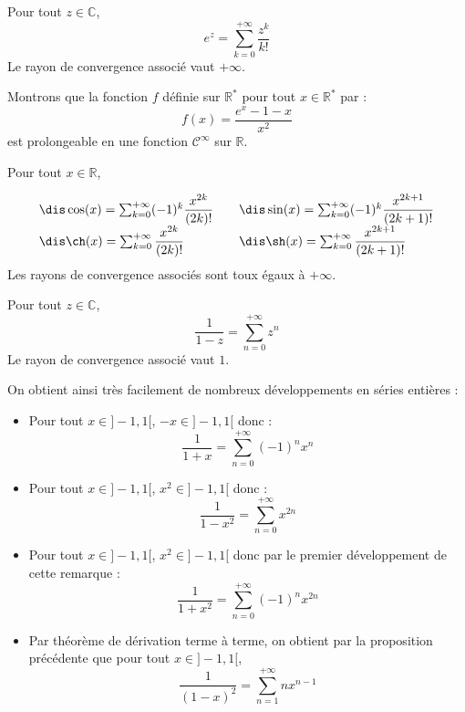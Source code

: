 \documentclass[a4paper,10pt]{report}
\begin{document}
\begin{thm} Pour tout $z \in \mathbb{C}$,
$$ e^z = \sum_{k=0}^{+ \infty} \dfrac{z^k}{k!}$$
Le rayon de convergence associé vaut $+ \infty$.
\end{thm}

\begin{preuve}
\vspace{11cm}
\end{preuve}

\begin{ex} Montrons que la fonction $f$ définie sur $\mathbb{R}^*$ pour tout $x \in \mathbb{R}^*$ par :
$$ f(x) = \frac{e^x-1-x}{x^2}$$
est prolongeable en une fonction $\mathcal{C}^{\infty}$ sur $\mathbb{R}$.

\vspace{5cm}
\end{ex}

\begin{cor} Pour tout $x \in \mathbb{R}$,

$$ \begin{array}{ll}
\dis \cos(x) = \sum_{k=0}^{+ \infty} (-1)^k \dfrac{x^{2k}}{(2k)!} & \quad \dis  \sin(x) = \sum_{k=0}^{+ \infty} (-1)^k \dfrac{x^{2k+1}}{(2k+1)!}\\
\dis \ch(x) = \sum_{k=0}^{+ \infty} \dfrac{x^{2k}}{(2k)!} & \quad \dis  \sh(x) = \sum_{k=0}^{+ \infty}  \dfrac{x^{2k+1}}{(2k+1)!} \end{array}$$
Les rayons de convergence associés sont toux égaux à $+ \infty$.
\end{cor}

\begin{preuve}
\vspace{6cm}
\end{preuve}

\begin{prop} Pour tout $z \in \mathbb{C}$,
$$ \dfrac{1}{1-z} = \sum_{n=0}^{+ \infty} z^n$$ 
Le rayon de convergence associé vaut $1$.
\end{prop}

\begin{rem} On obtient ainsi très facilement de nombreux développements en séries entières :

\begin{itemize}
\item Pour tout $x \in ]-1,1[$, $-x \in ]-1,1[$ donc :
$$ \dfrac{1}{1+x} = \sum_{n=0}^{+ \infty} (-1)^n x^n$$
\item Pour tout $x \in ]-1,1[$, $x^2 \in ]-1,1[$ donc :
$$ \dfrac{1}{1-x^2}=  \sum_{n=0}^{+ \infty} x^{2n}$$
\item Pour tout $x \in ]-1,1[$, $x^2 \in ]-1,1[$ donc par le premier développement de cette remarque :
$$ \dfrac{1}{1+x^2} = \sum_{n=0}^{+ \infty} (-1)^n x^{2n}$$
\item Par théorème de dérivation terme à terme, on obtient par la proposition précédente que pour tout $x \in ]-1,1[$,
$$ \dfrac{1}{(1-x)^2} = \sum_{n=1}^{+ \infty} n x^{n-1}$$
\end{itemize}
\end{rem}
\end{document}

